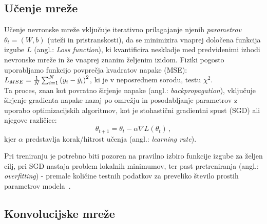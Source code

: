 \documentclass[12pt, a4paper]{article}
\begin{document}
\subsection{Učenje mreže}
\label{sec:NNlearning}

Učenje nevronske mreže vključuje iterativno prilagajanje njenih \textit{parametrov} $\theta_t = (W, b)$ (uteži in pristranskosti), da se minimizira vnaprej določena funkcija izgube $L$ (angl.: \textit{Loss function}), ki kvantificira neskladje med predvidenimi izhodi nevronske mreže in že vnaprej znanim željenim izidom. Fiziki pogosto uporabljamo funkcijo povprečja kvadratov napake (MSE): $L_{MSE} = {1\over N}\sum_{i=1}^N\left(y_i - \hat{y}_i\right)^2$, ki je v neposrednem sorodu, testu $\chi^2$. \\
Ta proces, znan kot povratno širjenje napake (angl.: \textit{backpropagation}), vključuje širjenje gradienta napake nazaj po omrežju in posodabljanje parametrov z uporabo optimizacijskih algoritmov, kot je stohastični gradientni spust (SGD) ali njegove različice:
\begin{equation}
    \theta_{t+1} = \theta_t - \alpha\nabla L(\theta_t)\,,
\end{equation}
kjer $\alpha$ predstavlja korak/hitrost učenja (angl.: \textit{learning rate}).

Pri treniranju je potrebno biti pozoren na pravilno izbiro funkcije izgube za željen cilj, pri SGD nastaja problem lokalnih minimumov, ter past pretreniranja (angl.: \textit{overfitting}) - premale količine testnih podatkov za preveliko število prostih parametrov modela~\cite{SGD, Overfitting}.


\subsection{Konvolucijske mreže}
\end{document}
